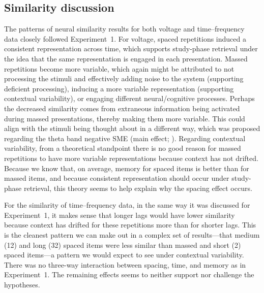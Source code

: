 \subsection{Similarity discussion}

The patterns of neural similarity results for both voltage and time--frequency data closely followed Experiment~1.  For voltage, spaced repetitions induced a consistent representation across time, which supports study-phase retrieval under the idea that the same representation is engaged in each presentation.  Massed repetitions become more variable, which again might be attributed to not processing the stimuli and effectively adding noise to the system (supporting deficient processing), inducing a more variable representation (supporting contextual variability), or engaging different neural/cognitive processes.
Perhaps the decreased similarity comes from extraneous information being activated during massed presentations, thereby making them more variable.  This could align with the stimuli being thought about in a different way, which was proposed regarding the theta band negative SME (main effect; ).
Regarding contextual variability, from a theoretical standpoint there is no good reason for massed repetitions to have more variable representations because context has not drifted.  Because we know that, on average, memory for spaced items is better than for massed items, and because consistent representation should occur under study-phase retrieval, this theory seems to help explain why the spacing effect occurs.

For the similarity of time--frequency data, in the same way it was discussed for Experiment~1, it makes sense that longer lags would have lower similarity because context has drifted for these repetitions more than for shorter lags.  This is the cleanest pattern we can make out in a complex set of results---that medium (12) and long (32) spaced items were less similar than massed and short (2) spaced items---a pattern we would expect to see under contextual variability.  There was no three-way interaction between spacing, time, and memory as in Experiment~1.  The remaining effects seems to neither support nor challenge the hypotheses.





